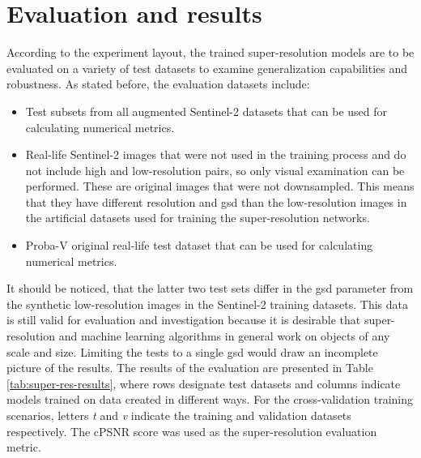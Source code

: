 \section{Evaluation and results}
According to the experiment layout, the trained super-resolution models are to be evaluated on a variety of test datasets to examine generalization capabilities and robustness.
As stated before, the evaluation datasets include:
\begin{itemize}
	\item Test subsets from all augmented Sentinel-2 datasets that can be used for calculating numerical metrics.
	\item Real-life Sentinel-2 images that were not used in the training process and do not include high and low-resolution pairs, so only visual examination can be performed. These are original images that were not downsampled. This means that they have different resolution and \gls{gsd} than the low-resolution images in the artificial datasets used for training the super-resolution networks. 
	\item Proba-V original real-life test dataset that can be used for calculating numerical metrics.
\end{itemize}
It should be noticed, that the latter two test sets differ in the \gls{gsd} parameter from the synthetic low-resolution images in the Sentinel-2 training datasets.
This data is still valid for evaluation and investigation because it is desirable that super-resolution and machine learning algorithms in general work on objects of any scale and size.
Limiting the tests to a single \gls{gsd} would draw an incomplete picture of the results.
The results of the evaluation are presented in Table \ref{tab:super-res-results}, where rows designate test datasets and columns indicate models trained on data created in different ways.
For the cross-validation training scenarios, letters \textit{t} and \textit{v} indicate the training and validation datasets respectively.
The cPSNR score was used as the super-resolution evaluation metric.

